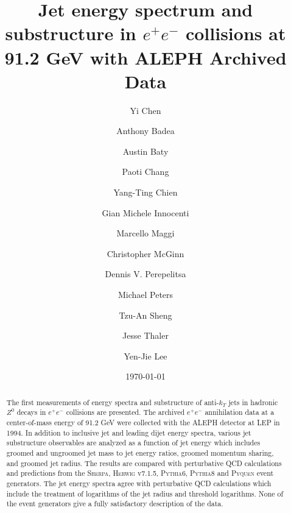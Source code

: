 \documentclass[aps,preprint,superscriptaddress,groupedaddress]{revtex4}  %
\newcommand{\sherpa}{\textsc{Sherpa}\xspace}
\newcommand{\herwig}{\textsc{Herwig}\xspace}
\newcommand{\pythia}[1]{\textsc{Pythia}{#1}\xspace}
\newcommand{\pyquen}{\textsc{Pyquen}\xspace}
\begin{document}
\widetext
{}



\title{Jet energy spectrum and substructure in $e^+e^-$ collisions at 91.2 GeV with ALEPH Archived Data}

\author{Yi Chen}
%

\author{Anthony Badea}
%

\author{Austin Baty}
%

\author{Paoti Chang}
%

\author{Yang-Ting Chien}

\author{Gian Michele Innocenti}
%

\author{Marcello Maggi}
%

\author{Christopher McGinn}
%

\author{Dennis V. Perepelitsa}
%

\author{Michael Peters}
%

\author{Tzu-An Sheng}
%

\author{Jesse Thaler}
%

\author{Yen-Jie Lee}
%

\date{\today}


\begin{abstract}
The first measurements of energy spectra and substructure of anti-$k_{T}$ jets in hadronic $Z^0$ decays in $e^+e^-$ collisions are presented. The archived $e^+e^-$ annihilation data at a center-of-mass energy of 91.2 GeV were collected with the ALEPH detector at LEP in 1994. In addition to inclusive jet and leading dijet energy spectra, various jet substructure observables are analyzed as a function of jet energy which includes groomed and ungroomed jet mass to jet energy ratios, groomed momentum sharing, and groomed jet radius. The results are compared with perturbative QCD calculations and predictions from the \sherpa, \herwig v7.1.5, \pythia{6}, \pythia{8} and \pyquen event generators. The jet energy spectra agree with perturbative QCD calculations which include the treatment of logarithms of the jet radius and threshold logarithms. None of the event generators give a fully satisfactory description of the data. 
\end{abstract}
\end{document}
